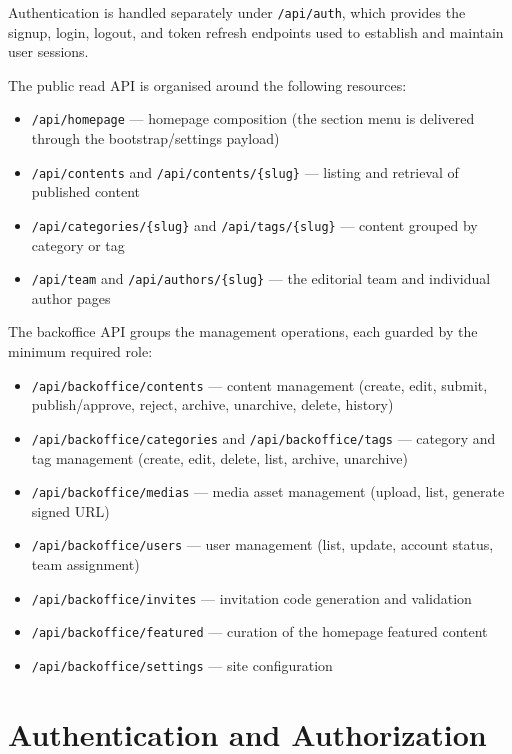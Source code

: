 Authentication is handled separately under \texttt{/api/auth}, which provides the
signup, login, logout, and token refresh endpoints used to establish and maintain
user sessions.

The public read API is organised around the following resources:

\begin{itemize}
      \item \texttt{/api/homepage} --- homepage composition (the section menu is delivered through the bootstrap/settings payload)
      \item \texttt{/api/contents} and \texttt{/api/contents/\{slug\}} --- listing and retrieval of published content
      \item \texttt{/api/categories/\{slug\}} and \texttt{/api/tags/\{slug\}} --- content grouped by category or tag
      \item \texttt{/api/team} and \texttt{/api/authors/\{slug\}} --- the editorial team and individual author pages
\end{itemize}

The backoffice API groups the management operations, each guarded by the minimum
required role:

\begin{itemize}
      \item \texttt{/api/backoffice/contents} --- content management (create, edit, submit, publish/approve, reject, archive, unarchive, delete, history)
      \item \texttt{/api/backoffice/categories} and \texttt{/api/backoffice/tags} --- category and tag management (create, edit, delete, list, archive, unarchive)
      \item \texttt{/api/backoffice/medias} --- media asset management (upload, list, generate signed URL)
      \item \texttt{/api/backoffice/users} --- user management (list, update, account status, team assignment)
      \item \texttt{/api/backoffice/invites} --- invitation code generation and validation
      \item \texttt{/api/backoffice/featured} --- curation of the homepage featured content
      \item \texttt{/api/backoffice/settings} --- site configuration
\end{itemize}

\section{Authentication and Authorization} \label{sec:arch_auth}

